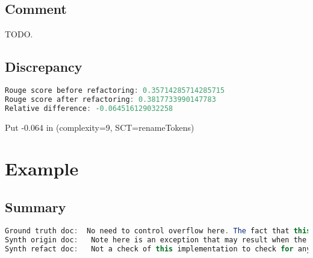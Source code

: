 \documentclass[11pt]{article}
\begin{document}
  \subsection{Comment}

  TODO.

  \subsection{Discrepancy}

  \begin{lstlisting}[language=java]
Rouge score before refactoring: 0.35714285714285715
Rouge score after refactoring: 0.3817733990147783
Relative difference: -0.064516129032258
  \end{lstlisting}

  Put -0.064 in (complexity=9, SCT=renameTokens)

  \pagebreak
  \section{Example}
  \subsection{Summary}

  \begin{lstlisting}[language=java]
Ground truth doc:  No need to control overflow here. The fact that this has overflow will be used as a flag to determine
Synth origin doc:   Note here is an exception that may result when the writer checks whether there exist problems or otherwise to
Synth refact doc:   Not a check of this implementation to check for any errors but also it seems useful here as to
  \end{lstlisting}
\end{document}
